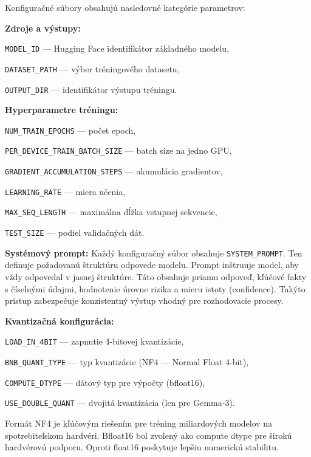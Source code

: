 Konfiguračné súbory obsahujú nasledovné kategórie parametrov:
 
\textbf{Zdroje a výstupy:}\par\medskip
\noindent\texttt{MODEL\_ID} — Hugging Face identifikátor základného modelu,\par\medskip
\noindent\texttt{DATASET\_PATH} — výber tréningového datasetu,\par\medskip
\noindent\texttt{OUTPUT\_DIR} — identifikátor výstupu tréningu.\par\medskip
 
\textbf{Hyperparametre tréningu:}\par\medskip
\noindent\texttt{NUM\_TRAIN\_EPOCHS} — počet epoch,\par\medskip
\noindent\texttt{PER\_DEVICE\_TRAIN\_BATCH\_SIZE} — batch size na jedno GPU,\par\medskip
\noindent\texttt{GRADIENT\_ACCUMULATION\_STEPS} — akumulácia gradientov,\par\medskip
\noindent\texttt{LEARNING\_RATE} — miera učenia,\par\medskip
\noindent\texttt{MAX\_SEQ\_LENGTH} — maximálna dĺžka vstupnej sekvencie,\par\medskip
\noindent\texttt{TEST\_SIZE} — podiel validačných dát.\par\medskip
 
\textbf{Systémový prompt:}
Každý konfiguračný súbor obsahuje \texttt{SYSTEM\_PROMPT}. Ten definuje požadovanú štruktúru odpovede modelu. Prompt inštruuje model, aby vždy odpovedal v jasnej štruktúre. Táto obsahuje priamu odpoveď, kľúčové fakty s číselnými údajmi, hodnotenie úrovne rizika a mieru istoty (confidence). Takýto prístup zabezpečuje konzistentný výstup vhodný pre rozhodovacie procesy.
 
\textbf{Kvantizačná konfigurácia:}\par\medskip
\noindent\texttt{LOAD\_IN\_4BIT} — zapnutie 4-bitovej kvantizácie,\par\medskip
\noindent\texttt{BNB\_QUANT\_TYPE} — typ kvantizácie (NF4 — Normal Float 4-bit),\par\medskip
\noindent\texttt{COMPUTE\_DTYPE} — dátový typ pre výpočty (bfloat16),\par\medskip
\noindent\texttt{USE\_DOUBLE\_QUANT} — dvojitá kvantizácia (len pre Gemma-3).\par\medskip
 
Formát NF4 je kľúčovým riešením pre tréning miliardových modelov na spotrebiteľskom hardvéri. Bfloat16 bol zvolený ako compute dtype pre širokú hardvérovú podporu. Oproti float16 poskytuje lepšiu numerickú stabilitu.
 
